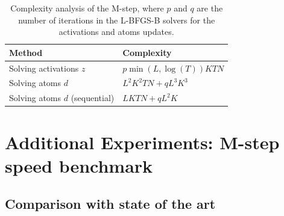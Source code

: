 \begin{table}[htb]
\begin{center}
\begin{tabular}{|l|l|}
\hline
Method & Complexity \\
\hline
Solving activations $z$ & $p\min(L, \log(T))KTN$ \\
Solving atoms $d$ & $L^2K^2TN + qL^3K^3$ \\
Solving atoms $d$ (sequential) & $LKTN + qL^2K$ \\
\hline
\end{tabular}
\vspace{5pt}
\caption[Complexity analysis of the M-step.]{Complexity analysis of the M-step, where $p$ and $q$ are the number of iterations in the L-BFGS-B solvers for the activations and atoms updates.}
\label{table:complexity_m}
\end{center}
\end{table}

\section{Additional Experiments: M-step speed benchmark}

\subsection{Comparison with state of the art}


